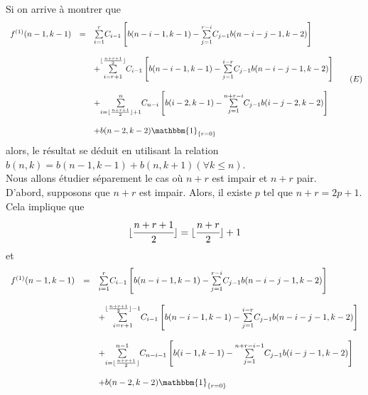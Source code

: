 Si on arrive à montrer que
$$
	\begin{array} {l l l}
		f^{(1)}(n-1,k-1) & =       & \underset{i=1}{\overset{r}{\sum}}C_{i-1}\left[b(n-i-1,k-1)-\underset{j=1}{\overset{r-i}{\sum}}C_{j-1}b(n-i-j-1,k-2)\right]                               \\ &\text{ }&\\ &\text{}&+\underset{i=r+1}{\overset{\lfloor \frac{n+r+1}{2}\rfloor}{\sum}}C_{i-1}\left[b(n-i-1,k-1)-\underset{j=1}{\overset{i-r}{\sum}}C_{j-1}b(n-i-j-1,k-2)\right]\\ &\text{ }&\\
		                 & \text{} & +\underset{i=\lfloor \frac{n+r+1}{2}\rfloor+1}{\overset{n}{\sum}}C_{n-i}\left[b(i-2,k-1)-\underset{j=1}{\overset{n+r-i}{\sum}}C_{j-1}b(i-j-2,k-2)\right] \\ &\text{ }&\\
		                 & \text{} & +b(n-2,k-2)\mathbbm{1}_{\{r = 0\}}
	\end{array} \hspace{15pt}(E)
$$
alors, le résultat se déduit en utilisant la relation $b(n, k) = b(n-1, k-1) + b(n, k+1) (\forall k\leq n)$.
\vspace{10pt}\\
Nous allons étudier séparement le cas où $n+r$ est impair et $n+r$ pair.\\
D'abord, supposons que $n + r$ est impair. Alors, il existe $p$ tel que $n+r=2p+1$.\\
Cela implique que $$\lfloor \cfrac{n+r+1}{2}\rfloor = \lfloor \cfrac{n+r}{2} \rfloor +1$$ et
\[
	\begin{array} {l l l}
		f^{(1)}(n-1,k-1) & =        & \underset{i=1}{\overset{r}{\sum}}C_{i-1}\left[b(n-i-1,k-1)-\underset{j=1}{\overset{r-i}{\sum}}C_{j-1}b(n-i-j-1,k-2)\right]                                   \\ &\text{ }&\\ &\text{ }&+\underset{i=r+1}{\overset{\lfloor \frac{n+r+1}{2}\rfloor -1}{\sum}}C_{i-1}\left[b(n-i-1,k-1)-\underset{j=1}{\overset{i-r}{\sum}}C_{j-1}b(n-i-j-1,k-2)\right]\\ &\text{ }&\\
		                 & \text{ } & +\underset{i=\lfloor \frac{n+r+1}{2}\rfloor}{\overset{n-1}{\sum}}C_{n-i-1}\left[b(i-1,k-1)-\underset{j=1}{\overset{n+r-i-1}{\sum}}C_{j-1}b(i-j-1,k-2)\right] \\ &\text{ }&\\
		                 & \text{ } & +b(n-2,k-2)\mathbbm{1}_{\{r = 0\}}                                                                                                                           \\
	\end{array}
\]
